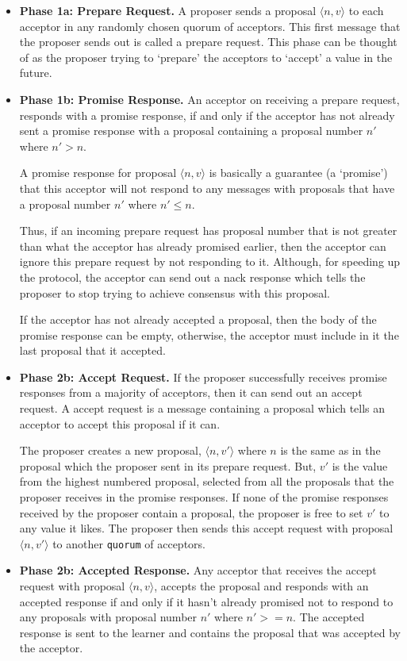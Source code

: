 \begin{itemize}
  \item \textbf{Phase 1a: Prepare Request.}
    A proposer sends a proposal
    $\langle n, v \rangle$ to each acceptor in any randomly chosen \textsf{quorum} of acceptors.
    This first message that the proposer sends out is called a \textsf{prepare request}.
    This phase can be thought of as the proposer trying to
    `prepare' the acceptors to `accept' a value in the future.
  \item \textbf{Phase 1b: Promise Response.}
    An acceptor on receiving a prepare request, responds with a \textsf{promise response},
    if and only if the acceptor has not already sent a promise response with
    a proposal containing a proposal number $n'$ where $n' > n$.

    A promise response for proposal $\langle n, v \rangle$ is basically a
    guarantee (a `promise') that this acceptor will not respond to any
    messages with proposals that have a proposal number $n'$ where $n' \leq n$.

    Thus, if an incoming prepare request has proposal number that is not
    greater than what the
    acceptor has already promised earlier, then the acceptor can ignore this
    prepare request by not responding to it. Although, for speeding up the
    protocol, the acceptor can send out a \textsf{nack response} which tells the
    proposer to stop trying to achieve consensus with this proposal.

    If the acceptor has not already accepted a proposal, then the body of
    the promise response can be empty, otherwise, the acceptor must include in it the
    last proposal that it accepted.
  \item \textbf{Phase 2b: Accept Request.}
    If the proposer successfully receives promise responses from a majority of
    acceptors, then it can send out an \textsf{accept request}. A accept request is
    a message containing a proposal which tells an acceptor to accept this
    proposal if it can.

    The proposer creates a new proposal, $\langle n, v' \rangle$ where $n$ is
    the same as in the proposal which the proposer sent in its prepare request.
    But, $v'$ is the value from the highest numbered proposal, selected from all
    the proposals that the proposer receives in the promise responses.
    If none of the promise responses received by the proposer contain a proposal,
    the proposer is free to set $v'$ to any value it likes.
    The proposer then sends this accept request with proposal $\langle n, v' \rangle$
    to another \texttt{quorum} of acceptors.
  \item \textbf{Phase 2b: Accepted Response.}
    Any acceptor that receives the accept request with proposal $\langle n, v \rangle$,
    accepts the proposal and
    responds with an \textsf{accepted response} if and only if it hasn't already promised
    not to respond to any proposals with proposal number $n'$ where $n' >= n$.
    The \textsf{accepted response} is sent to the learner and contains the proposal
    that was accepted by the acceptor.
\end{itemize}

